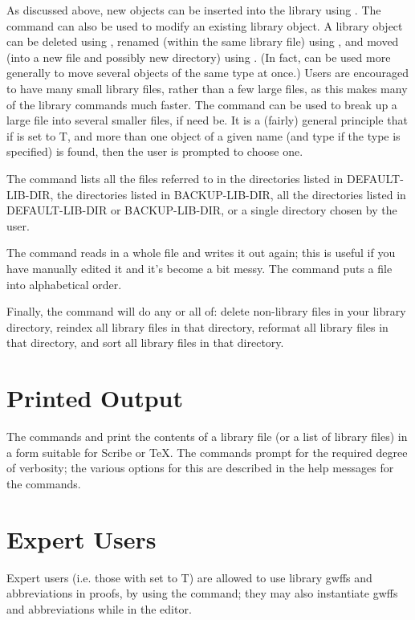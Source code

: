 As discussed above, new objects can be inserted into the library using .
The  command can also be used to modify an existing library object.
A library object can be deleted using , renamed (within the same library
file) using , and moved (into a new file and possibly new directory)
using .  (In fact,  can be used
more generally to move several objects of the same type at once.)
Users are encouraged to have many small library files, rather than a few large
files, as this makes many of the library commands much faster. The command
 can be used to break up a large file into several smaller files,
if need be.
It is a (fairly) general principle that if  is set to T,
and more than one object of a given name (and type if the type is specified) is found,
then the user is prompted to choose one.

The command
 lists all the files referred to in the directories
listed in DEFAULT-LIB-DIR, the directories listed in BACKUP-LIB-DIR, all the
directories listed in DEFAULT-LIB-DIR or BACKUP-LIB-DIR, or a single directory
chosen by the user.

The  command reads in a whole file and writes it out again;
this is useful if you have manually edited it and it's become a bit messy.
The  command puts a file into alphabetical order.

Finally, the command  will do any or all of: delete non-library
files in your library directory, reindex all library files in that directory, reformat
all library files in that directory, and sort all library files in that directory.

\section{Printed Output}
The commands  and 
print the contents of a library file (or a list of library files)
in a form suitable for Scribe or TeX.
The commands prompt for the required degree of verbosity; the various options
for this are described in the help messages for the commands.

\section{Expert Users}
Expert users (i.e. those with  set to T)
are allowed to use library gwffs and
abbreviations in proofs, by using the 
command; they may also instantiate gwffs and
abbreviations while in the editor.

